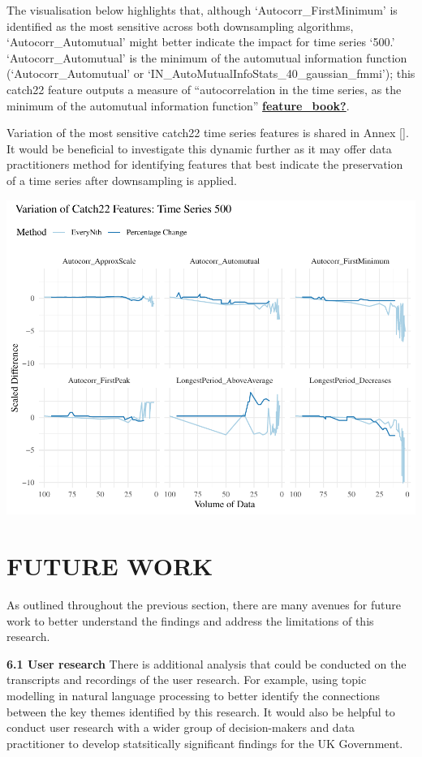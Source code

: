 \documentclass{article}
\begin{document}
The visualisation below highlights that, although
`Autocorr\_FirstMinimum' is identified as the most sensitive across both
downsampling algorithms, `Autocorr\_Automutual' might better indicate
the impact for time series `500.' `Autocorr\_Automutual' is the minimum
of the automutual information function (`Autocorr\_Automutual' or
`IN\_AutoMutualInfoStats\_40\_gaussian\_fmmi'); this catch22 feature
outputs a measure of ``autocorrelation in the time series, as the
minimum of the automutual information function''
\protect\hyperlink{ref-feature_book}{\textbf{feature\_book?}}.

Variation of the most sensitive catch22 time series features is shared
in Annex {[}{]}. It would be beneficial to investigate this dynamic
further as it may offer data practitioners method for identifying
features that best indicate the preservation of a time series after
downsampling is applied.

\includegraphics{210431461_CSC8639_Dissertation_files/figure-latex/Catch22Variation-1.pdf}

\hypertarget{future-work}{%
\section{FUTURE WORK}\label{future-work}}

\label{sec:headings}

As outlined throughout the previous section, there are many avenues for
future work to better understand the findings and address the
limitations of this research.

\textbf{6.1 User research} There is additional analysis that could be
conducted on the transcripts and recordings of the user research. For
example, using topic modelling in natural language processing to better
identify the connections between the key themes identified by this
research. It would also be helpful to conduct user research with a wider
group of decision-makers and data practitioner to develop statsitically
significant findings for the UK Government.
\end{document}
